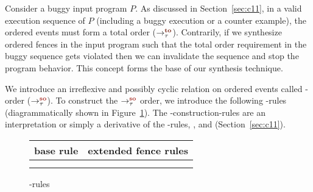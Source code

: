 Consider a buggy input program $P$.
%
As discussed in Section~\ref{sec:c11}, in a valid \cc execution 
sequence of $P$ (including a buggy execution or a counter example), 
the \sc ordered events must form a total order ($\setTO$).
%
Contrarily, if we synthesize \sc ordered fences in the input program 
such that the total order requirement in the buggy sequence gets violated 
then we can invalidate the sequence and stop the program behavior.
This concept forms the base of our synthesis technique.

We introduce an irreflexive and possibly cyclic relation
on \sc ordered events called \sc-order ($\setSO$).
%
To construct the $\setSO$ order, we introduce the following \lso-rules
(diagrammatically shown in Figure~\ref{fig:so rules}).
The \lso-construction-rules are an interpretation or simply a derivative 
of the \lto-rules, ,  and  
(Section~\ref{sec:c11}).

\begin{figure}[t]
	\begin{tabular}{|c||c|c|c|}
		\multicolumn{1}{c}{base rule} & 
		\multicolumn{3}{c}{extended fence rules} \\\hline
		
		\resizebox{0.24\textwidth}{!}{} &
		\resizebox{0.24\textwidth}{!}{} &
		\resizebox{0.24\textwidth}{!}{} &
		\resizebox{0.24\textwidth}{!}{} \\\hline
		
		\resizebox{0.24\textwidth}{!}{} &
		\resizebox{0.24\textwidth}{!}{} &
		\resizebox{0.24\textwidth}{!}{} &
		\resizebox{0.24\textwidth}{!}{} \\
		\hline
	\end{tabular}
	\caption{\lso-rules}
	\label{fig:so rules}
\end{figure}

